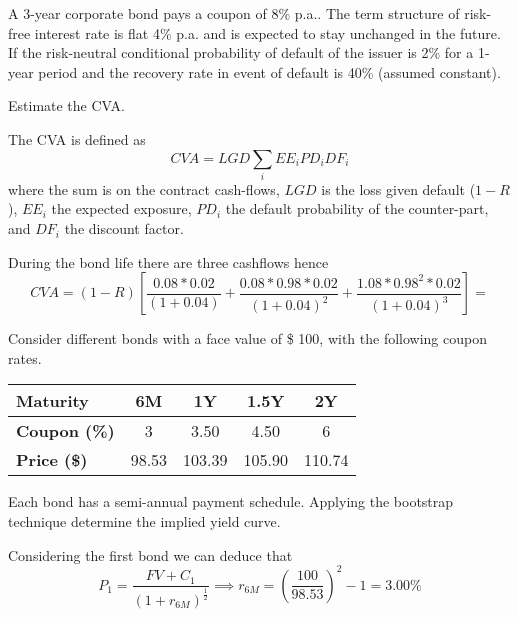 \documentclass[12pt,a4paper]{exam}
\begin{document}
\begin{questions}

\question
A 3-year corporate bond pays a coupon of 8\% p.a.. The term structure of risk-free interest rate is flat 4\% p.a. and is expected to stay unchanged in the future. If the risk-neutral conditional probability of default of the issuer is 2\% for a 1-year period and the recovery rate in event of default is 40\% (assumed constant).

Estimate the CVA.
\fillwithlines{3cm}
\begin{solution}
The CVA is defined as 
\begin{equation*}
	CVA = LGD\sum_i EE_i PD_i DF_i
\end{equation*}
where the sum is on the contract cash-flows, $LGD$ is the loss given default ($1-R$), $EE_i$ the expected exposure, $PD_i$ the default probability of the counter-part, and $DF_i$ the discount factor.

During the bond life there are three cashflows hence
\begin{equation*}
	CVA = (1-R)\left[\frac{0.08*0.02}{(1+0.04)}+\frac{0.08*0.98*0.02}{(1+0.04)^2}+\frac{1.08*0.98^2*0.02}{(1+0.04)^3}\right]=
\end{equation*}
\end{solution}

\question
Consider different bonds with a face value of \$ 100, with the following coupon rates.

\begin{table}[h]
  \begin{center}
    \begin{tabular}{|l|c|c|c|c|}
      \hline
      \textbf{Maturity}    & 6M    & 1Y     & 1.5Y   & 2Y  \\ \hline
      \textbf{Coupon (\%)} & 3     & 3.50   & 4.50   & 6 \\ \hline
      \textbf{Price (\$)}  & 98.53 & 103.39 & 105.90 & 110.74 \\ \hline
    \end{tabular}
    \end{center}
  \end{table}
Each bond has a semi-annual payment schedule. Applying the bootstrap technique determine the implied yield curve.
\fillwithlines{3cm}
\begin{solution}
Considering the first bond we can deduce that
\begin{equation*}
  P_1 = \frac{FV + C_1}{(1+r_{6M})^{\frac{1}{2}}} \implies r_{6M} = \left(\frac{100}{98.53}\right)^{2} -1 = 3.00\%
\end{equation*}


\end{solution}
\end{questions}
\end{document}
